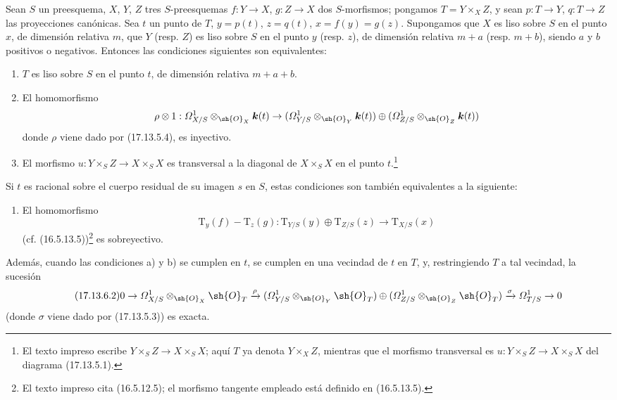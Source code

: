 \begin{corollary}[17.13.6]
\label{IV.17.13.6}
Sean $S$ un preesquema, $X$, $Y$, $Z$ tres $S$-preesquemas $f:Y\to X$, $g:Z\to X$ dos $S$-morfismos; pongamos $T=Y\times_XZ$, y sean $p:T\to Y$, $q:T\to Z$ las proyecciones canónicas. Sea $t$ un punto de $T$, $y=p(t)$, $z=q(t)$, $x=f(y)=g(z)$. Supongamos que $X$ es liso sobre $S$ en el punto $x$, de dimensión relativa $m$, que $Y$ \textup{(resp. $Z$)} es liso sobre $S$ en el punto $y$ \textup{(resp. $z$)}, de dimensión relativa $m+a$ \textup{(resp. $m+b$)}, siendo $a$ y $b$ positivos o negativos. Entonces las condiciones siguientes son equivalentes:
\begin{enumerate}
  \item[\textup{a)}] $T$ es liso sobre $S$ en el punto $t$, de dimensión relativa $m+a+b$.
  \item[\textup{b)}] El homomorfismo
  \[
  \rho\otimes1:\varOmega^1_{X/S}\otimes_{\sh{O}_X}\boldsymbol k(t)\to
  (\varOmega^1_{Y/S}\otimes_{\sh{O}_Y}\boldsymbol k(t))\oplus
  (\varOmega^1_{Z/S}\otimes_{\sh{O}_Z}\boldsymbol k(t))
  \]
  donde $\rho$ viene dado por \textup{(17.13.5.4)}, es inyectivo.
  \item[\textup{c)}] El morfismo $u:Y\times_SZ\to X\times_SX$ es transversal a la diagonal de $X\times_SX$ en el punto $t$.\footnote{El texto impreso escribe $Y\times_SZ\to X\times_SX$; aquí $T$ ya denota $Y\times_XZ$, mientras que el morfismo transversal es $u:Y\times_SZ\to X\times_SX$ del diagrama (17.13.5.1).}
\end{enumerate}
Si $t$ es racional sobre el cuerpo residual de su imagen $s$ en $S$, estas condiciones son también equivalentes a la siguiente:
\begin{enumerate}
  \item[\textup{b$'$)}] El homomorfismo
  \[
  \label{IV.17.13.6.1}
  \tag{17.13.6.1}
  \mathrm{T}_y(f)-\mathrm{T}_z(g):\mathrm{T}_{Y/S}(y)\oplus\mathrm{T}_{Z/S}(z)\to\mathrm{T}_{X/S}(x)
  \]
  \textup{(cf. (16.5.13.5))}\footnote{El texto impreso cita (16.5.12.5); el morfismo tangente empleado está definido en (16.5.13.5).} es sobreyectivo.
\end{enumerate}
Además, cuando las condiciones \textup{a)} y \textup{b)} se cumplen en $t$, se cumplen en una vecindad de $t$ en $T$, y, restringiendo $T$ a tal vecindad, la sucesión
\[
\label{IV.17.13.6.2}
\tag{17.13.6.2}
0\to\varOmega^1_{X/S}\otimes_{\sh{O}_X}\sh{O}_T\xrightarrow{\rho}
(\varOmega^1_{Y/S}\otimes_{\sh{O}_Y}\sh{O}_T)\oplus
(\varOmega^1_{Z/S}\otimes_{\sh{O}_Z}\sh{O}_T)
\xrightarrow{\sigma}\varOmega^1_{T/S}\to0
\]
\textup{(}donde $\sigma$ viene dado por \textup{(17.13.5.3))} es exacta.
\end{corollary}


